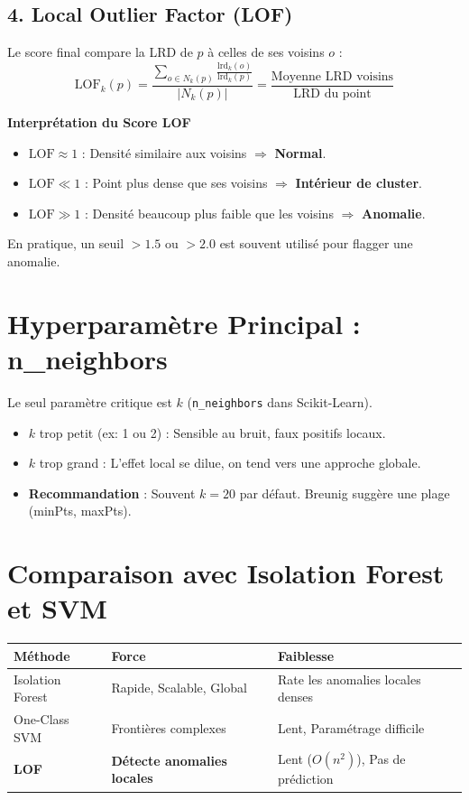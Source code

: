 \documentclass[a4paper,11pt]{article}
\begin{document}
\subsection{4. Local Outlier Factor (LOF)}
Le score final compare la LRD de $p$ à celles de ses voisins $o$ :
$$ \text{LOF}_k(p) = \frac{\sum_{o \in N_k(p)} \frac{\text{lrd}_k(o)}{\text{lrd}_k(p)}}{|N_k(p)|} = \frac{\text{Moyenne LRD voisins}}{\text{LRD du point}} $$

\begin{mathbox}
\textbf{Interprétation du Score LOF}

\begin{itemize}
    \item $\text{LOF} \approx 1$ : Densité similaire aux voisins $\Rightarrow$ \textbf{Normal}.
    \item $\text{LOF} \ll 1$ : Point plus dense que ses voisins $\Rightarrow$ \textbf{Intérieur de cluster}.
    \item $\text{LOF} \gg 1$ : Densité beaucoup plus faible que les voisins $\Rightarrow$ \textbf{Anomalie}.
\end{itemize}
En pratique, un seuil $> 1.5$ ou $> 2.0$ est souvent utilisé pour flagger une anomalie.
\end{mathbox}

\section{Hyperparamètre Principal : n\_neighbors}

Le seul paramètre critique est $k$ (\texttt{n\_neighbors} dans Scikit-Learn).
\begin{itemize}
    \item $k$ trop petit (ex: 1 ou 2) : Sensible au bruit, faux positifs locaux.
    \item $k$ trop grand : L'effet local se dilue, on tend vers une approche globale.
    \item \textbf{Recommandation} : Souvent $k=20$ par défaut. Breunig suggère une plage (minPts, maxPts).
\end{itemize}

\section{Comparaison avec Isolation Forest et SVM}

\begin{center}
\begin{tabular}{|l|l|l|}
\hline
\textbf{Méthode} & \textbf{Force} & \textbf{Faiblesse} \\
\hline
Isolation Forest & Rapide, Scalable, Global & Rate les anomalies locales denses \\
One-Class SVM & Frontières complexes & Lent, Paramétrage difficile \\
\textbf{LOF} & \textbf{Détecte anomalies locales} & Lent ($O(n^2)$), Pas de prédiction \\
\hline
\end{tabular}
\end{center}
\end{document}
